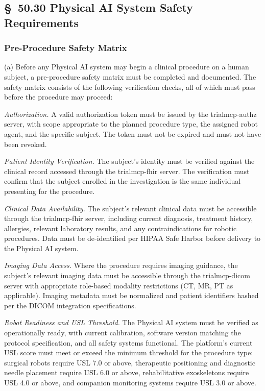 \documentclass[11pt]{article}
\begin{document}
\subsection{\S~50.30 Physical AI System Safety Requirements}

\subsubsection{Pre-Procedure Safety Matrix}

(a) Before any Physical AI system may begin a clinical procedure on a human subject, a pre-procedure safety matrix must be completed and documented. The safety matrix consists of the following verification checks, all of which must pass before the procedure may proceed:

\begin{description}[leftmargin=1.0cm,style=sameline]
\item[(1)] \textit{Authorization.} A valid authorization token must be issued by the trialmcp-authz server, with scope appropriate to the planned procedure type, the assigned robot agent, and the specific subject. The token must not be expired and must not have been revoked.
\item[(2)] \textit{Patient Identity Verification.} The subject's identity must be verified against the clinical record accessed through the trialmcp-fhir server. The verification must confirm that the subject enrolled in the investigation is the same individual presenting for the procedure.
\item[(3)] \textit{Clinical Data Availability.} The subject's relevant clinical data must be accessible through the trialmcp-fhir server, including current diagnosis, treatment history, allergies, relevant laboratory results, and any contraindications for robotic procedures. Data must be de-identified per HIPAA Safe Harbor before delivery to the Physical AI system.
\item[(4)] \textit{Imaging Data Access.} Where the procedure requires imaging guidance, the subject's relevant imaging data must be accessible through the trialmcp-dicom server with appropriate role-based modality restrictions (CT, MR, PT as applicable). Imaging metadata must be normalized and patient identifiers hashed per the DICOM integration specifications.
\item[(5)] \textit{Robot Readiness and USL Threshold.} The Physical AI system must be verified as operationally ready, with current calibration, software version matching the protocol specification, and all safety systems functional. The platform's current USL score must meet or exceed the minimum threshold for the procedure type: surgical robots require USL 7.0 or above, therapeutic positioning and diagnostic needle placement require USL 6.0 or above, rehabilitative exoskeletons require USL 4.0 or above, and companion monitoring systems require USL 3.0 or above.

\end{description}
\end{document}
